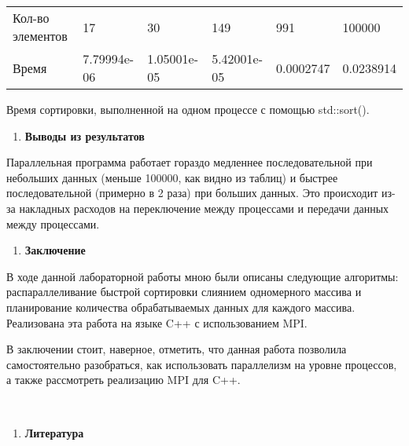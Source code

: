 \documentclass[]{article}
\begin{document}
\begin{longtable}[]{@{}llllll@{}}
\toprule
Кол-во элементов & 17 & 30 & 149 & 991 & 100000\tabularnewline
Время & 7.79994e-06 & 1.05001e-05 & 5.42001e-05 & 0.0002747 &
0.0238914\tabularnewline
\bottomrule
\end{longtable}

Время сортировки, выполненной на одном процессе с помощью std::sort().

\begin{enumerate}
\def\labelenumi{\arabic{enumi}.}
\setcounter{enumi}{1}
\item
  \textbf{Выводы из результатов}
\end{enumerate}

Параллельная программа работает гораздо медленнее последовательной при
небольших данных (меньше 100000, как видно из таблиц) и быстрее
последовательной (примерно в 2 раза) при больших данных. Это происходит
из-за накладных расходов на переключение между процессами и передачи
данных между процессами.

\begin{enumerate}
\def\labelenumi{\arabic{enumi}.}
\setcounter{enumi}{1}
\item
  \textbf{Заключение}
\end{enumerate}

В ходе данной лабораторной работы мною были описаны следующие алгоритмы:
распараллеливание быстрой сортировки слиянием одномерного массива и
планирование количества обрабатываемых данных для каждого массива.
Реализована эта работа на языке C++ с использованием MPI.

В заключении стоит, наверное, отметить, что данная работа позволила
самостоятельно разобраться, как использовать параллелизм на уровне
процессов, а также рассмотреть реализацию MPI для C++.

\textbf{\\
}

\begin{enumerate}
\def\labelenumi{\arabic{enumi}.}
\setcounter{enumi}{1}
\item
  \textbf{Литература}
\end{enumerate}
\end{document}
